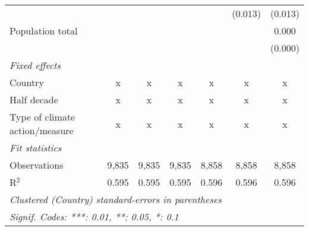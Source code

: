\begin{tabular}{lcccccc}
                                                                &         &              &              &               & (0.013)       & (0.013)\\   
   Population total                                             &         &              &              &               &               & 0.000\\   
                                                                &         &              &              &               &               & (0.000)\\   
   \emph{Fixed effects}\\
   Country                                                      & x       & x            & x            & x             & x             & x\\  
   Half decade                                                  & x       & x            & x            & x             & x             & x\\  
   Type of climate action/measure                               & x       & x            & x            & x             & x             & x\\  
   \midrule \emph{Fit statistics}\\
   Observations                                                 & 9,835   & 9,835        & 9,835        & 8,858         & 8,858         & 8,858\\  
   R$^2$                                                        & 0.595   & 0.595        & 0.595        & 0.596         & 0.596         & 0.596\\  
   \midrule
   \multicolumn{7}{l}{\emph{Clustered (Country) standard-errors in parentheses}}\\
   \multicolumn{7}{l}{\emph{Signif. Codes: ***: 0.01, **: 0.05, *: 0.1}}\\
\end{tabular}
\par\endgroup


